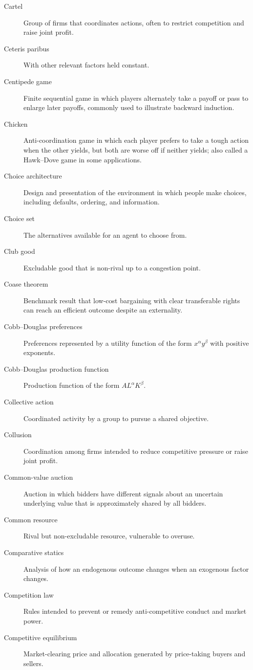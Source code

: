 \begin{description}
  \item[Cartel] Group of firms that coordinates actions, often to restrict competition and raise joint profit.
  \item[Ceteris paribus] With other relevant factors held constant.
  \item[Centipede game] Finite sequential game in which players alternately take a payoff or pass to enlarge later payoffs, commonly used to illustrate backward induction.
  \item[Chicken] Anti-coordination game in which each player prefers to take a tough action when the other yields, but both are worse off if neither yields; also called a Hawk--Dove game in some applications.
  \item[Choice architecture] Design and presentation of the environment in which people make choices, including defaults, ordering, and information.
  \item[Choice set] The alternatives available for an agent to choose from.
  \item[Club good] Excludable good that is non-rival up to a congestion point.
  \item[Coase theorem] Benchmark result that low-cost bargaining with clear transferable rights can reach an efficient outcome despite an externality.
  \item[Cobb--Douglas preferences] Preferences represented by a utility function of the form $x^\alpha y^\beta$ with positive exponents.
  \item[Cobb--Douglas production function] Production function of the form $AL^\alpha K^\beta$.
  \item[Collective action] Coordinated activity by a group to pursue a shared objective.
  \item[Collusion] Coordination among firms intended to reduce competitive pressure or raise joint profit.
  \item[Common-value auction] Auction in which bidders have different signals about an uncertain underlying value that is approximately shared by all bidders.
  \item[Common resource] Rival but non-excludable resource, vulnerable to overuse.
  \item[Comparative statics] Analysis of how an endogenous outcome changes when an exogenous factor changes.
  \item[Competition law] Rules intended to prevent or remedy anti-competitive conduct and market power.
  \item[Competitive equilibrium] Market-clearing price and allocation generated by price-taking buyers and sellers.

\end{description}
